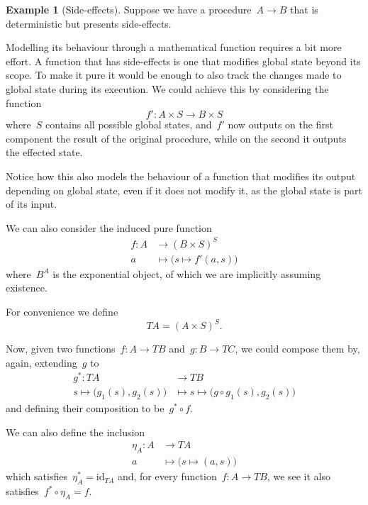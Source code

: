 \documentclass[a4paper]{article}
\theoremstyle{plain}
\theoremstyle{definition}
\newtheorem{example}[theorem]{Example}
\newcommand{\id}{\mathrm{id}}
\begin{document}
\begin{example}[Side-effects]
    \label{ex:kleisli-side-effects}
    Suppose we have a procedure~\(A\longrightarrow B\) that is deterministic but
    presents side-effects.

    Modelling its behaviour through a mathematical function requires a bit more
    effort. A function that has side-effects is one that modifies global state
    beyond its scope. To make it pure it would be enough to also track the
    changes made to global state during its execution. We could achieve this by
    considering the function
    \[
        f':A\times S\longrightarrow B\times S
    \]
    where~\(S\) contains all possible global states, and~\(f'\) now outputs on
    the first component the result of the original procedure, while on the
    second it outputs the effected state.

    Notice how this also models the behaviour of a function that modifies its
    output depending on global state, even if it does not modify it, as the
    global state is part of its input.

    We can also consider the induced pure function
    \begin{align*}
        f:A&\longrightarrow(B\times S)^{S} \\
        a&\longmapsto\bigr(s\mapsto f'(a,s)\bigl)
    \end{align*}
    where~\(B^{A}\) is the exponential object, of which we are implicitly
    assuming existence.

    For convenience we define
    \[
        TA = (A\times S)^{S}.
    \]

    Now, given two functions~\(f:A\longrightarrow TB\)
    and~\(g:B\longrightarrow TC\), we could compose them by, again,
    extending~\(g\) to
    \begin{align*}
        g^{\ast}:TA&\longrightarrow TB \\
        s\mapsto\bigl(g_{1}(s),g_{2}(s)\bigr)&\longmapsto
        s\mapsto\bigl(g\circ g_{1}(s),g_{2}(s)\bigr)
    \end{align*}
    and defining their composition to be~\(g^{\ast} \circ f\).

    We can also define the inclusion
    \begin{align*}
        \eta_{A}:A&\longrightarrow TA \\
        a&\longmapsto\bigl(s\mapsto(a,s)\bigr)
    \end{align*}
    which satisfies~\(\eta_{A}^{\ast}=\id_{TA}\) and, for every
    function~\(f:A\longrightarrow TB\), we see it also
    satisfies~\(f^{\ast}\circ\eta_{A}=f\).
\end{example}
\end{document}

